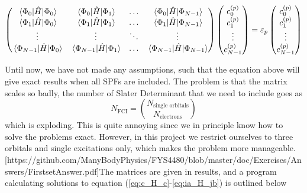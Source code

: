 \begin{equation}
\begin{pmatrix}
\mel{\Phi_0}{\hat{H}}{\Phi_0} & \mel{\Phi_0}{\hat{H}}{\Phi_1} & \hdots & \mel{\Phi_0}{\hat{H}}{\Phi_{N-1}}\\
\mel{\Phi_1}{\hat{H}}{\Phi_0} & \mel{\Phi_1}{\hat{H}}{\Phi_1} & \hdots & \mel{\Phi_1}{\hat{H}}{\Phi_{N-1}}\\
\vdots & \vdots & \ddots & \vdots\\
\mel{\Phi_{N-1}}{\hat{H}}{\Phi_0} & \mel{\Phi_{N-1}}{\hat{H}}{\Phi_1} & \hdots & \mel{\Phi_{N-1}}{\hat{H}}{\Phi_{N-1}}\\
\end{pmatrix}
\begin{pmatrix}
c_0^{(p)}\\ c_1^{(p)} \\ \vdots\\ c_{N-1}^{(p)}
\end{pmatrix}
=\varepsilon_p
\begin{pmatrix}
c_0^{(p)}\\ c_1^{(p)} \\ \vdots\\ c_{N-1}^{(p)}
\end{pmatrix}
\label{eq:CIS_matrix}
\end{equation}

Until now, we have not made any assumptions, such that the equation above will give exact results when all SPFs are included. The problem is that the matrix scales so badly, the number of Slater Determinant that we need to include goes as 
\begin{equation}
N_{\text{FCI}}=\binom{N_{\text{single orbitals}}}{N_{\text{electrons}}}
\end{equation}
which is exploding. This is quite annoying since we in principle know how to solve the problems exact. However, in this project we restrict ourselves to three orbitals and single excitations only, which makes the problem more manageable. [https://github.com/ManyBodyPhysics/FYS4480/blob/master/doc/Exercises/Answers/FirstsetAnswer.pdf]The matrices are given in results, and a program calculating solutions to equation (\ref{eq:c_H_c}-\ref{eq:ia_H_jb}) is outlined below

